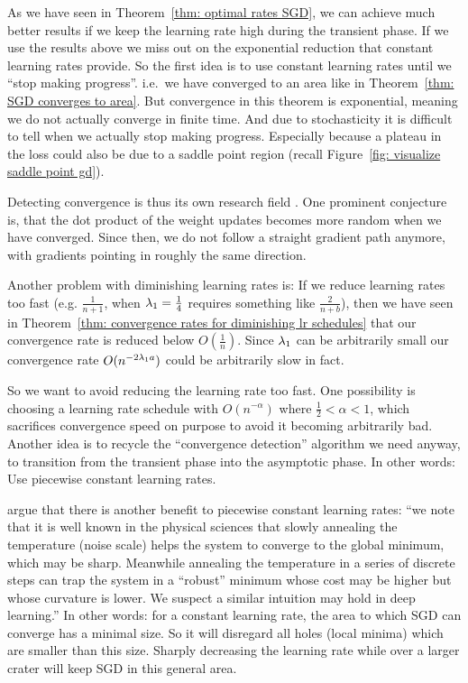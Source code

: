 As we have seen in Theorem~\ref{thm: optimal rates SGD}, we can achieve
much better results if we keep the learning rate high during the transient
phase. If we use the results above we miss out on the exponential reduction that
constant learning rates provide. So the first idea is to use constant learning
rates until we ``stop making progress''. i.e.\ we have converged to an area like
in Theorem~\ref{thm: SGD converges to area}. But convergence in this theorem is
exponential, meaning we do not actually converge in finite time. And due to
stochasticity it is difficult to tell when we actually stop making progress.
Especially because a plateau in the loss could also be due to a saddle point
region (recall Figure~\ref{fig: visualize saddle point gd}).

Detecting convergence is thus its own research field \parencite[for a recent
approach including an overview of previous work see
e.g.][]{pesmeConvergenceDiagnosticBasedStep2020}. One prominent conjecture is,
that the dot product of the weight updates becomes more random when we have
converged. Since then, we do not follow a straight gradient path anymore, with
gradients pointing in roughly the same direction.

Another problem with diminishing learning rates is: If we reduce learning rates
too fast (e.g. \(\tfrac{1}{n+1}\), when \(\lambda_1=\tfrac14\) requires something
like \(\tfrac{2}{n+b}\)), then we have seen in Theorem~\ref{thm: convergence
rates for diminishing lr schedules} that our convergence rate is reduced below
\(O(\tfrac1n)\). Since \(\lambda_1\) can be arbitrarily small our convergence rate
\(O(n^{-2\lambda_1 a})\) could be arbitrarily slow in fact.

So we want to avoid reducing the learning rate too fast. One possibility is
choosing a learning rate schedule with \(O(n^{-\alpha})\) where \(\tfrac12<\alpha<1\),
which sacrifices convergence speed on purpose to avoid it becoming arbitrarily
bad. Another idea is to recycle the ``convergence detection'' algorithm we
need anyway, to transition from the transient phase into the asymptotic phase.
In other words: Use piecewise constant learning rates.

\textcite{smithDonDecayLearning2018} argue that there is another benefit to
piecewise constant learning rates: ``we note that it is well known in the
physical sciences that slowly annealing the temperature (noise scale) helps the
system to converge to the global minimum, which may be sharp. Meanwhile
annealing the temperature in a series of discrete steps can trap the system in a
“robust” minimum whose cost may be higher but whose curvature is lower. We
suspect a similar intuition may hold in deep learning.''
In other words: for a constant learning rate, the area to which SGD can converge
has a minimal size. So it will disregard all holes (local minima) which are
smaller than this size. Sharply decreasing the learning rate while over a larger
crater will keep SGD in this general area.


